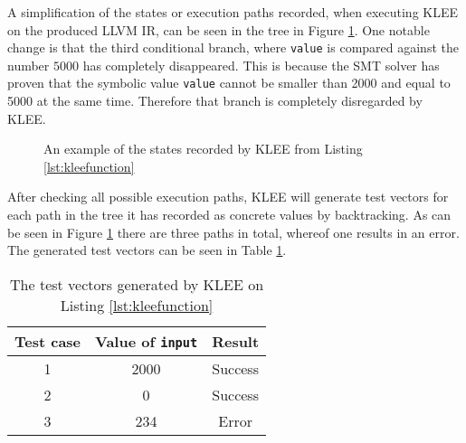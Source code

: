 A simplification of the states or execution paths recorded, when executing KLEE
on the produced LLVM IR, can be seen in the tree in Figure
\ref{figure:kleetree}.  One notable change is that the third conditional
branch, where \texttt{value} is compared against the number $5000$ has
completely disappeared. This is because the SMT solver has proven that the
symbolic value \texttt{value} cannot be smaller than 2000 and equal to 5000 at
the same time.  Therefore that branch is completely disregarded by KLEE.
\begin{figure}[H]
    \centering
    \caption{An example of the states recorded by KLEE from Listing \ref{lst:kleefunction}}
    \label{figure:kleetree}
\end{figure}
After checking all possible execution paths, KLEE will generate test vectors
for each path in the tree it has recorded as concrete values by backtracking.
As can be seen in Figure \ref{figure:kleetree} there are three paths in total,
whereof one results in an error. The generated test vectors can be seen in Table
\ref{tab:kleeexample}.

\begin{table}[h]
    \centering
    \begin{tabular}{||c c c||}
        \hline
        Test case & Value of \texttt{input} & Result \\ [0.5ex]
        \hline\hline
        1 & 2000 & Success\\
        \hline
        2 & 0 & Success \\
        \hline
        3 & 234 & Error \\
        \hline
    \end{tabular}
    \caption{The test vectors generated by KLEE on Listing \ref{lst:kleefunction}}
    \label{tab:kleeexample}
\end{table}

